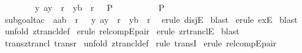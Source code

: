 \begin{isabellebody}
\ \ \ \ \ \ \ \ {\isacharbang}{\isacharbang}y{\isachardot}{\isacharbrackleft}{\isacharbar}\ {\isacharparenleft}a{\isacharcomma}y{\isacharparenright}\ {\isacharcolon}\ r{\isacharpercent}{\isacharplus}{\isacharsemicolon}\ \ {\isacharparenleft}y{\isacharcomma}b{\isacharparenright}\ {\isacharcolon}\ r\ {\isacharbar}{\isacharbrackright}\ {\isacharequal}{\isacharequal}{\isachargreater}\ P\ \ \ \isanewline
\ \ \ \ \ {\isacharbar}{\isacharbrackright}\ {\isacharequal}{\isacharequal}{\isachargreater}\ P{\isachardoublequoteclose}\isanewline
%
\isadelimproof
%
\endisadelimproof
%
\isatagproof
{}\isamarkupfalse%
\ {\isacharparenleft}subgoal{\isacharunderscore}tac\ {\isachardoublequoteopen}\ {\isacharparenleft}a{\isacharcolon}{\isacharcolon}{\isacharprime}a{\isacharcomma}b{\isacharparenright}\ {\isacharcolon}\ r\ {\isacharbar}\ {\isacharparenleft}{\isacharquery}\ y{\isachardot}\ {\isacharparenleft}a{\isacharcomma}y{\isacharparenright}\ {\isacharcolon}\ r{\isacharpercent}{\isacharplus}\ {\isacharampersand}\ {\isacharparenleft}y{\isacharcomma}b{\isacharparenright}\ {\isacharcolon}\ r{\isacharparenright}\ {\isachardoublequoteclose}{\isacharparenright}\isanewline
{}\isamarkupfalse%
\ {\isacharparenleft}erule\ disjE{\isacharparenright}\isanewline
{}\isamarkupfalse%
\ blast\isanewline
{}\isamarkupfalse%
\ {\isacharparenleft}erule\ exE{\isacharparenright}\isanewline
{}\isamarkupfalse%
\ blast\isanewline
{}\isamarkupfalse%
\ {\isacharparenleft}unfold\ ztrancl{\isacharunderscore}def{\isacharparenright}\isanewline
{}\isamarkupfalse%
\ {\isacharparenleft}erule\ rel{\isacharunderscore}compEpair{\isacharparenright}\isanewline
{}\isamarkupfalse%
\ {\isacharparenleft}erule\ zrtranclE{\isacharparenright}\isanewline
{}\isamarkupfalse%
\ blast{\isacharplus}\isanewline
{}\isamarkupfalse%
%
\endisatagproof
{\isafoldproof}%
%
\isadelimproof
\isanewline
%
\endisadelimproof
\isanewline
\isanewline
{}\isamarkupfalse%
\ trans{\isacharunderscore}ztrancl{\isacharcolon}\ {\isachardoublequoteopen}trans{\isacharparenleft}r{\isacharpercent}{\isacharplus}{\isacharparenright}{\isachardoublequoteclose}\isanewline
%
\isadelimproof
%
\endisadelimproof
%
\isatagproof
{}\isamarkupfalse%
\ {\isacharparenleft}unfold\ ztrancl{\isacharunderscore}def{\isacharparenright}\isanewline
{}\isamarkupfalse%
\ {\isacharparenleft}rule\ transI{\isacharparenright}\isanewline
{}\isamarkupfalse%
\ {\isacharparenleft}erule\ rel{\isacharunderscore}compEpair{\isacharparenright}{\isacharplus}\isanewline

\end{isabellebody}
